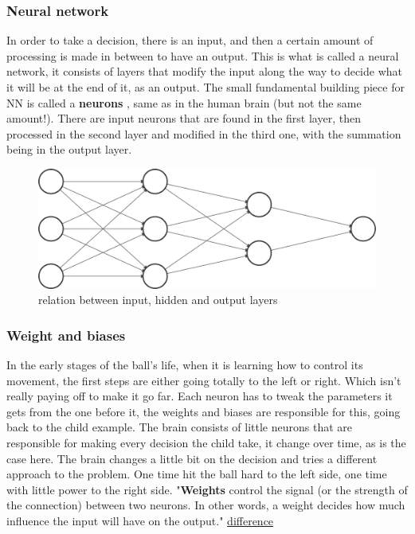 \subsubsection{Neural network}
In order to take a decision, there is an input, and then a certain amount of processing is made in between to have an output. This is what is called a neural network, it consists of layers that modify the input along the way to decide what it will be at the end of it, as an output. The small fundamental building piece for NN is called a \textbf{neurons} , same as in the human brain (but not the same amount!). There are input neurons that are found in the first layer, then processed in the second layer and modified in the third one, with the summation being in the output layer.

\begin{figure}
	\centering
	\includegraphics[width=0.7\linewidth]{usedImages/nn}
	\caption{relation between input, hidden and output layers}
	\label{fig:nn}
\end{figure}

\subsubsection{Weight and biases}

In the early stages of the ball's life, when it is learning how to control its movement, the first steps are either going totally to the left or right. Which isn't really paying off to make it go far. Each neuron has to tweak the parameters it gets from the one before it, the weights and biases are responsible for this, going back to the child example. The brain consists of little neurons that are responsible for making every decision the child take, it change over time, as is the case here. The brain changes a little bit on the decision and tries a different approach to the problem. One time hit the ball hard to the left side, one time with little power to the right side. "\textbf{Weights} control the signal (or the strength of the connection) between two neurons. In other words, a weight decides how much influence the input will have on the output." \href{https://machine-learning.paperspace.com/wiki/weights-and-biases}{difference}

